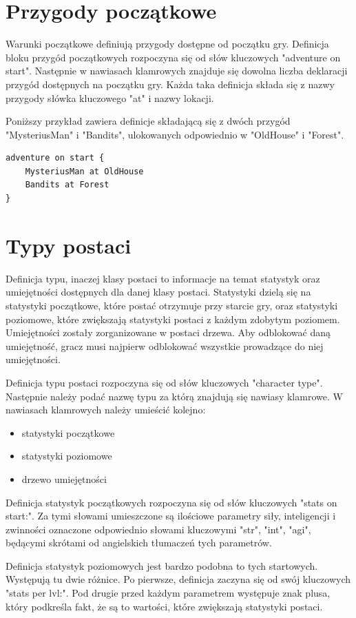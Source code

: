 \documentclass	{xmgr}
\begin{document}
\section{Przygody początkowe} 
Warunki początkowe definiują przygody dostępne od początku gry. Definicja bloku przygód początkowych rozpoczyna się od słów kluczowych
"adventure on start". Następnie w nawiasach klamrowych znajduje się dowolna liczba deklaracji przygód dostępnych na początku gry.
Każda taka definicja składa się z nazwy przygody słówka kluczowego "at" i nazwy lokacji.

Poniższy przykład zawiera definicje składającą się z dwóch przygód "MysteriusMan" i "Bandits", ulokowanych odpowiednio w "OldHouse" i "Forest".
\begin{lstlisting}
adventure on start {
	MysteriusMan at OldHouse
	Bandits at Forest
}
\end{lstlisting}
\section{Typy postaci}
Definicja typu, inaczej klasy postaci to informacje na temat statystyk oraz umiejętności dostępnych dla danej klasy postaci. Statystyki dzielą się na statystyki początkowe, które postać otrzymuje przy starcie gry, oraz statystyki poziomowe, które zwiększają statystyki postaci z każdym zdobytym poziomem. Umiejętności zostały zorganizowane w postaci drzewa. Aby odblokować daną umiejętność, gracz musi najpierw odblokować wszystkie prowadzące do niej umiejętności.

Definicja typu postaci rozpoczyna się od słów kluczowych "character type". Następnie należy podać nazwę typu za którą znajdują się nawiasy klamrowe. W nawiasach klamrowych należy umieścić kolejno:
\begin{itemize}
	\item statystyki początkowe
	\item statystyki poziomowe
	\item drzewo umiejętności
\end{itemize}

Definicja statystyk początkowych rozpoczyna się od słów kluczowych "stats on start:". Za tymi słowami umieszczone są ilościowe parametry siły, inteligencji i zwinności oznaczone odpowiednio słowami kluczowymi "str", "int", "agi", będącymi skrótami od angielskich tłumaczeń tych parametrów.

Definicja statystyk poziomowych jest bardzo podobna to tych startowych. Występują tu dwie różnice. Po pierwsze, definicja zaczyna się od swój kluczowych "stats per lvl:". Pod drugie przed każdym parametrem występuje znak plusa, który podkreśla fakt, że są to wartości, które zwiększają statystyki postaci. 
\end{document}
